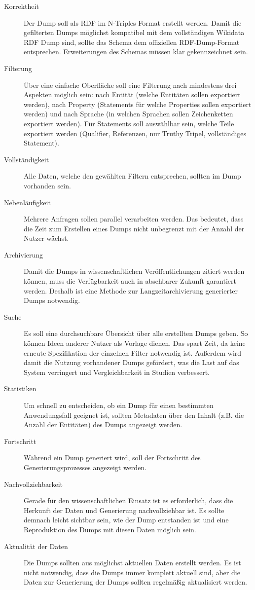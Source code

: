 \begin{description}
  \item[Korrektheit] Der Dump soll als RDF im N-Triples Format erstellt werden. Damit die gefilterten Dumps möglichst kompatibel mit dem vollständigen Wikidata RDF Dump sind, sollte das Schema dem offiziellen RDF-Dump-Format entsprechen. Erweiterungen des Schemas müssen klar gekennzeichnet sein.
  \item[Filterung] Über eine einfache Oberfläche soll eine Filterung nach mindestens drei Aspekten möglich sein: nach Entität (welche Entitäten sollen exportiert werden), nach Property (Statements für welche Properties sollen exportiert werden) und nach Sprache (in welchen Sprachen sollen Zeichenketten exportiert werden). Für Statements soll auswählbar sein, welche Teile exportiert werden (Qualifier, Referenzen, nur Truthy Tripel, vollständiges Statement).
  \item[Vollständigkeit] Alle Daten, welche den gewählten Filtern entsprechen, sollten im Dump vorhanden sein. 
  \item[Nebenläufigkeit] Mehrere Anfragen sollen parallel verarbeiten werden. Das bedeutet, dass die Zeit zum Erstellen eines Dumps nicht unbegrenzt mit der Anzahl der Nutzer wächst.
  \item[Archivierung] Damit die Dumps in wissenschaftlichen Veröffentlichungen zitiert werden können, muss die Verfügbarkeit auch in absehbarer Zukunft garantiert werden. Deshalb ist eine Methode zur Langzeitarchivierung generierter Dumps notwendig. 
  \item[Suche] Es soll eine durchsuchbare Übersicht über alle erstellten Dumps geben.
    So können Ideen anderer Nutzer als Vorlage dienen. Das spart Zeit, da keine erneute Spezifikation der einzelnen Filter notwendig ist. Außerdem wird damit die Nutzung vorhandener Dumps gefördert, was die Last auf das System verringert und Vergleichbarkeit in Studien verbessert.
  \item[Statistiken] Um schnell zu entscheiden, ob ein Dump für einen bestimmten Anwendungsfall geeignet ist, sollten Metadaten über den Inhalt (z.B. die Anzahl der Entitäten) des Dumps angezeigt werden. 
  \item[Fortschritt] Während ein Dump generiert wird, soll der Fortschritt des Generierungsprozesses angezeigt werden.
  \item[Nachvollziehbarkeit] Gerade für den wissenschaftlichen Einsatz ist es erforderlich, dass die Herkunft der Daten und Generierung nachvollziehbar ist. Es sollte demnach leicht sichtbar sein, wie der Dump entstanden ist und eine Reproduktion des Dumps mit diesen Daten möglich sein. 
  \item[Aktualität der Daten] Die Dumps sollten aus möglichst aktuellen Daten erstellt werden.
    Es ist nicht notwendig, dass die Dumps immer komplett aktuell sind, aber die Daten zur Generierung der Dumps sollten regelmäßig aktualisiert werden.
\end{description}

